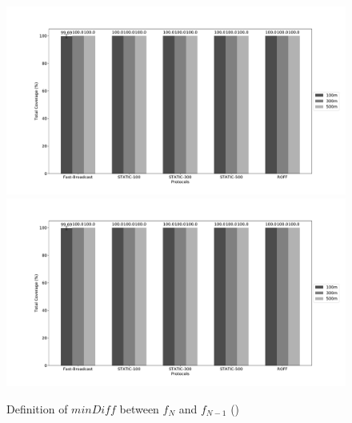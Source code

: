 \begin{figure}[H]
			\includegraphics[width=1.1\textwidth]{../../scripts/graphs/out/Platoon-15km/b0/j0-cw[32-1024]/totCoverage}
			\includegraphics[width=1.1\textwidth]{../../scripts/graphs/out/Platoon-15km/b0/j0-cw[32-1024]/totCoverage}
			\caption{Definition of $minDiff$ between $f_N$ and $f_{N-1}$ (\cite{6906275})}
			\label{fig:minDiff}
		\end{figure}





